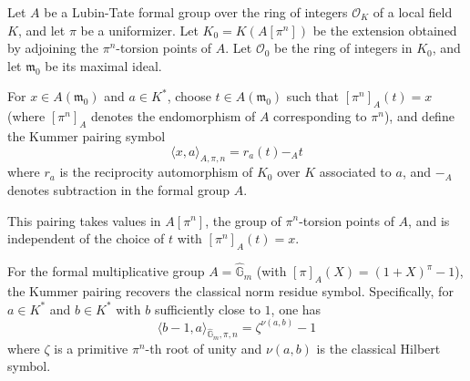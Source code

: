 \begin{definition}
Let $A$ be a Lubin-Tate formal group over the ring of integers $\mathcal{O}_K$ of a local field $K$, and let $\pi$ be a uniformizer. Let $K_0 = K(A[\pi^n])$ be the extension obtained by adjoining the $\pi^n$-torsion points of $A$. Let $\mathcal{O}_0$ be the ring of integers in $K_0$, and let $\mathfrak{m}_0$ be its maximal ideal.

For $x \in A(\mathfrak{m}_0)$ and $a \in K^{*}$, choose $t \in A(\mathfrak{m}_0)$ such that $[\pi^n]_A(t) = x$ (where $[\pi^n]_A$ denotes the endomorphism of $A$ corresponding to $\pi^n$), and define the Kummer pairing symbol
$$\langle x, a \rangle_{A,\pi,n} = r_a(t) -_A t$$
where $r_a$ is the reciprocity automorphism of $K_0$ over $K$ associated to $a$, and $-_{A}$ denotes subtraction in the formal group $A$.

This pairing takes values in $A[\pi^n]$, the group of $\pi^n$-torsion points of $A$, and is independent of the choice of $t$ with $[\pi^n]_A(t) = x$.
\end{definition}

\begin{example}
For the formal multiplicative group $A = \widehat{\mathbb{G}}_m$ (with $[\pi]_A(X) = (1+X)^{\pi} - 1$), the Kummer pairing recovers the classical norm residue symbol. Specifically, for $a \in K^{*}$ and $b \in K^{*}$ with $b$ sufficiently close to $1$, one has
$$\langle b-1, a \rangle_{\widehat{\mathbb{G}}_m,\pi,n} = \zeta^{\nu(a,b)} - 1$$
where $\zeta$ is a primitive $\pi^n$-th root of unity and $\nu(a,b)$ is the classical Hilbert symbol.
\end{example}
